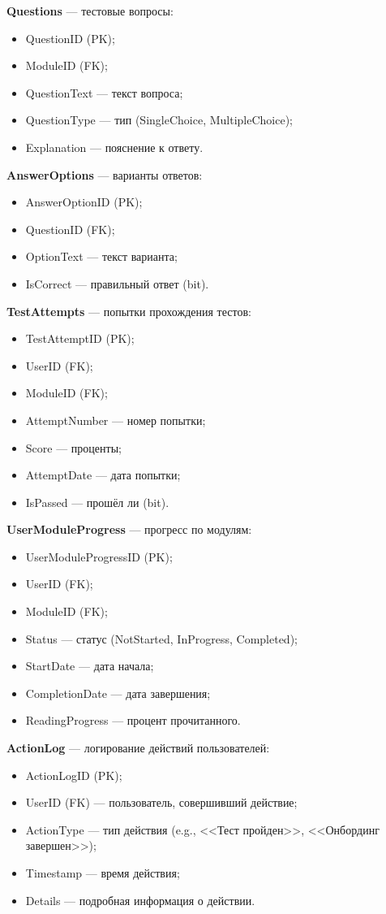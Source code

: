 \textbf{Questions} --- тестовые вопросы:
\begin{itemize}
    \item QuestionID (PK);
    \item ModuleID (FK);
    \item QuestionText --- текст вопроса;
    \item QuestionType --- тип (SingleChoice, MultipleChoice);
    \item Explanation --- пояснение к ответу.
\end{itemize}

\textbf{AnswerOptions} --- варианты ответов:
\begin{itemize}
    \item AnswerOptionID (PK);
    \item QuestionID (FK);
    \item OptionText --- текст варианта;
    \item IsCorrect --- правильный ответ (bit).
\end{itemize}

\textbf{TestAttempts} --- попытки прохождения тестов:
\begin{itemize}
    \item TestAttemptID (PK);
    \item UserID (FK);
    \item ModuleID (FK);
    \item AttemptNumber --- номер попытки;
    \item Score --- проценты;
    \item AttemptDate --- дата попытки;
    \item IsPassed --- прошёл ли (bit).
\end{itemize}

\textbf{UserModuleProgress} --- прогресс по модулям:
\begin{itemize}
    \item UserModuleProgressID (PK);
    \item UserID (FK);
    \item ModuleID (FK);
    \item Status --- статус (NotStarted, InProgress, Completed);
    \item StartDate --- дата начала;
    \item CompletionDate --- дата завершения;
    \item ReadingProgress --- процент прочитанного.
\end{itemize}

\textbf{ActionLog} --- логирование действий пользователей:
\begin{itemize}
    \item ActionLogID (PK);
    \item UserID (FK) --- пользователь, совершивший действие;
    \item ActionType --- тип действия (e.g., <<Тест пройден>>, <<Онбординг завершен>>);
    \item Timestamp --- время действия;
    \item Details --- подробная информация о действии.
\end{itemize}

